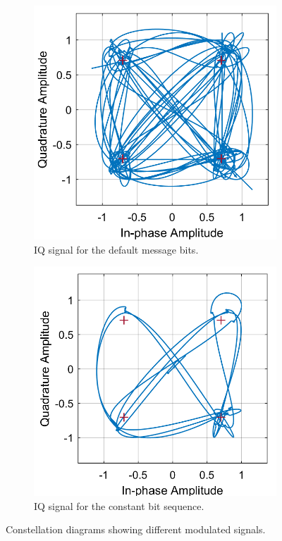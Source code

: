 \documentclass[12pt,a4paper]{report}
\begin{document}
\begin{figure}[!h]
    \centering
    \begin{subfigure}{0.4\textwidth}
        \centering
        \includegraphics[width = \textwidth]{Figures/mod_frame.png}
        \caption{IQ signal for the default message bits.}
        \label{fig:test:mod_rec:mod_iq:frame}
    \end{subfigure}
    \hspace{0.1\textwidth}
    \begin{subfigure}{0.4\textwidth}
        \centering
        \includegraphics[width = \textwidth]{Figures/mod_ones.png}
        \caption{IQ signal for the constant bit sequence.}
        \label{fig:test:mod_rec:mod_iq:ones}
    \end{subfigure}
    \caption{Constellation diagrams showing different modulated signals.}
    \label{fig:test:mod_rec:mod_iq}
\end{figure}
\end{document}
